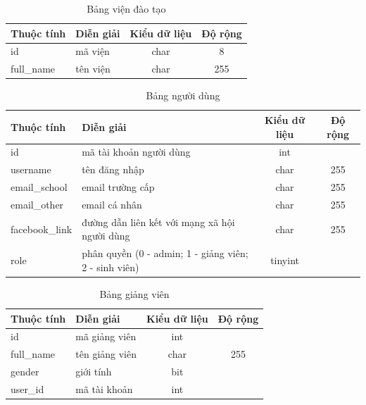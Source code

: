     \begin{table}[h!]
      \centering
      \begin{tabular}{|l|p{}|c|c|}
        \hline
        \textbf{Thuộc tính} & \textbf{Diễn giải} & \textbf{Kiểu dữ liệu} & \textbf{Độ rộng} \\
        \hline
        id & mã viện & char & 8 \\
        \hline
        full\_name & tên viện & char & 255\\
        \hline
      \end{tabular}
      \caption{Bảng viện đào tạo}
    \end{table}

    \begin{table}[h!]
      \centering
      \begin{tabular}{|l|p{}|c|c|}
        \hline
        \textbf{Thuộc tính} & \textbf{Diễn giải} & \textbf{Kiểu dữ liệu} & \textbf{Độ rộng} \\
        \hline
        id & mã tài khoản người dùng & int &  \\
        \hline
        username & tên đăng nhập & char & 255\\
        \hline
        email\_school & email trường cấp & char & 255\\
        \hline
        email\_other & email cá nhân & char & 255\\
        \hline
        facebook\_link & đường dẫn liên kết với mạng xã hội người dùng & char & 255\\
        \hline
        role & phân quyền (0 - admin; 1 - giảng viên; 2 - sinh viên) & tinyint & \\
        \hline
      \end{tabular}
      \caption{Bảng người dùng}
    \end{table}

    \begin{table}[h!]
      \centering
      \begin{tabular}{|l|p{}|c|c|}
        \hline
        \textbf{Thuộc tính} & \textbf{Diễn giải} & \textbf{Kiểu dữ liệu} & \textbf{Độ rộng} \\
        \hline
        id & mã giảng viên & int &  \\
        \hline
        full\_name & tên giảng viên & char & 255\\
        \hline
        gender & giới tính & bit & \\
        \hline
        user\_id & mã tài khoản & int & \\
        \hline
      \end{tabular}
      \caption{Bảng giảng viên}
    \end{table}

